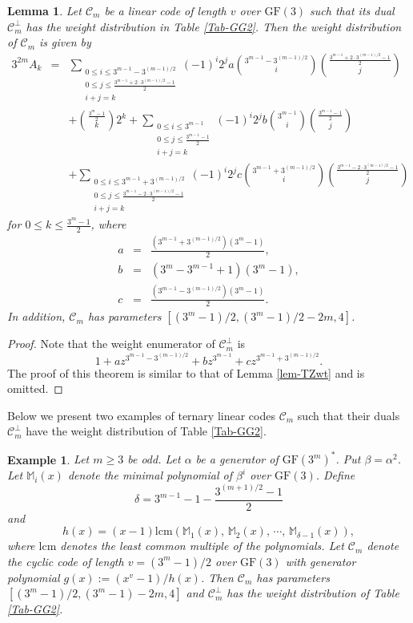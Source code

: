 \documentclass[1p,final]{elsarticle}
\newtheorem{lemma}[theorem]{Lemma}
\newtheorem{example}{Example}
\newcommand{\lcm}{{\mathrm{lcm}}}
\newcommand{\gf}{{\mathrm{GF}}}
\newcommand{\m}{\mathbb{M}}
\newcommand{\C}{{\mathcal{C}}}
\begin{document}
\begin{lemma}\label{lem-june21}
Let $\C_m$ be a linear code of length $v$ over $\gf(3)$ such that its dual $\C_m^\perp$ has the 
weight distribution in Table \ref{Tab-GG2}. Then the weight distribution of $\C_m$ is given by
\begin{eqnarray*}
3^{2m}A_k &=&  \sum_{\substack{0 \le i \le 3^{m-1}-3^{(m-1)/2} \\
0\le j \le \frac {3^{m-1}+2\cdot 3^{(m-1)/2}-1} {2} \\i+j=k}}(-1)^i2^ja\binom{3^{m-1}-3^{(m-1)/2}} {i} \binom{\frac {3^{m-1}+2 \cdot 3^{(m-1)/2}-1}{2}}{j}\\
& & +  \binom {\frac {3^m-1} {2}}{k}2^k+ \sum_{\substack{0 \le i \le 3^{m-1} \\
0\le j \le \frac {3^{m-1}-1} {2} \\i+j=k}}(-1)^i2^jb\binom{3^{m-1}} {i}\binom{\frac {3^{m-1}-1} {2}} {j} \\ & & + 
\sum_{\substack{0 \le i \le 3^{m-1}+3^{(m-1)/2} \\
0\le j \le \frac {3^{m-1}-2 \cdot 3^{(m-1)/2}-1}{2} \\i+j=k}}(-1)^i2^jc\binom{3^{m-1}+3^{(m-1)/2}}{i}\binom{\frac {3^{m-1}-2 \cdot 3^{(m-1)/2}-1}{2}}{j} 
\end{eqnarray*}
for $0 \le k \le \frac {3^m-1} {2}$, where 
\begin{eqnarray*}
a &=& \frac{(3^{m-1}+3^{(m-1)/2})(3^m-1)}{2}, \\ 
b &=& (3^m-3^{m-1}+1)(3^m-1), \\
c &=& \frac{(3^{m-1}-3^{(m-1)/2})(3^m-1)}{2}.
\end{eqnarray*} 
In addition, $\C_m$ has parameters $[(3^m-1)/2, (3^m-1)/2-2m, 4]$. 
\end{lemma}

\begin{proof}
Note that the weight enumerator of $\C_m^\perp$ is 
$$1+az^{3^{m-1}-3^{(m-1)/2}}+bz^{3^{m-1}}+cz^{3^{m-1}+3^{(m-1)/2}}.$$
The proof of this theorem is similar to that of Lemma \ref{lem-TZwt} and is omitted.
\end{proof}

Below we present two examples of ternary linear codes $\C_m$ such that their duals $\C_m^\perp$ 
have the weight distribution of Table \ref{Tab-GG2}. 

\begin{example}\label{exam-j271} 
Let $m \geq 3$ be odd. Let $\alpha$ be a generator of $\gf(3^m)^*$. Put $\beta=\alpha^2$. Let $\m_i(x)$ denote 
the minimal polynomial of $\beta^i$ over $\gf(3)$. Define 
$$ 
\delta=3^{m-1}-1-\frac{3^{(m+1)/2}-1}{2} 
$$
and 
$$ 
h(x)=(x-1)\lcm(\m_1(x), \, \m_2(x), \, \cdots, \, \m_{\delta-1}(x)), 
$$
where $\lcm$ denotes the least common multiple of the polynomials. 
Let $\C_m$ denote the cyclic code of length $v=(3^m-1)/2$ over $\gf(3)$ with 
generator polynomial $g(x):=(x^v-1)/h(x)$. Then $\C_m$ has parameters $[(3^m-1)/2, (3^m-1)-2m, 4]$ and 
$\C_m^\perp$ has the weight distribution of Table \ref{Tab-GG2}.  
\end{example}    
\end{document}
